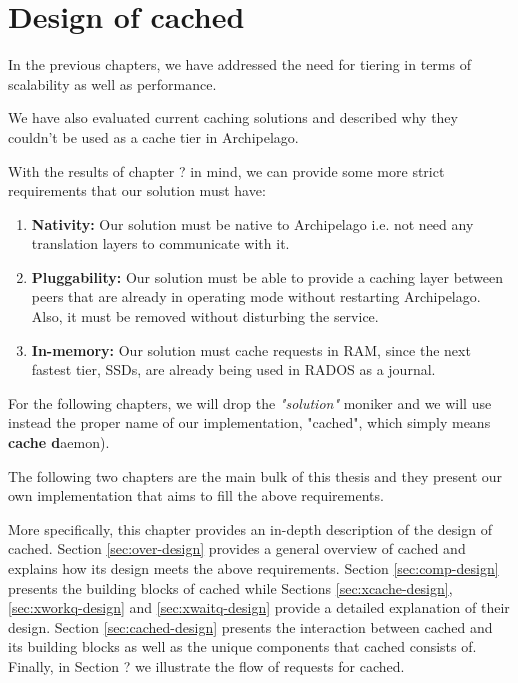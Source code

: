 \chapter{Design of cached}\label{ch:cached-design}

In the previous chapters, we have addressed the need for tiering in terms of
scalability as well as performance. %

We have also evaluated current caching solutions and described why they couldn't 
be used as a cache tier in Archipelago. %

With the results of chapter ? in mind, we can provide some more strict 
requirements that our solution must have:

\begin{enumerate}
	\item \textbf{Nativity:} Our solution must be native to Archipelago i.e.  
		not need any translation layers to communicate with it.
	\item \textbf{Pluggability:} Our solution must be able to provide a 
		caching layer between peers that are already in operating mode 
		without restarting Archipelago. Also, it must be removed 
		without disturbing the service.
	\item \textbf{In-memory:} Our solution must cache requests in RAM, 
		since the next fastest tier, SSDs, are already being used in 
		RADOS as a journal.
\end{enumerate}

For the following chapters, we will drop the \textit{"solution"} moniker and we 
will use instead the proper name of our implementation, "cached", which simply 
means \textbf{cache d}aemon).

The following two chapters are the main bulk of this thesis and they present our 
own implementation that aims to fill the above requirements.

More specifically, this chapter provides an in-depth description of the design 
of cached.  Section \ref{sec:over-design} provides a general overview of cached 
and explains how its design meets the above requirements. Section 
\ref{sec:comp-design} presents the building blocks of cached while Sections 
\ref{sec:xcache-design}, \ref{sec:xworkq-design} and \ref{sec:xwaitq-design} 
provide a detailed explanation of their design. Section \ref{sec:cached-design}  
presents the interaction between cached and its building blocks as well as the 
unique components that cached consists of. Finally, in Section ?  we illustrate 
the flow of requests for cached.

